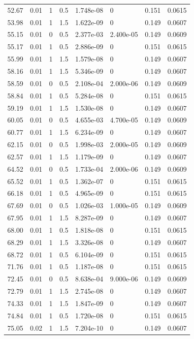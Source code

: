 \documentclass[preview]{standalone}
\begin{document}
{{{\begin{tabular}{L{1.2cm}C{1.2cm} C{0.3cm}C{0.5cm} C{1.4cm}C{1.4cm} C{1.4cm}C{1.4cm}}
  52.67  &  0.01  & 1     & 0.5 &  1.748e-08  & 0  & 0.151 &  0.0615   \\ 
  53.98  &  0.01  & 1     & 1.5 &  1.622e-09  & 0  & 0.149 &  0.0607   \\ 
  55.15  &  0.01  & 0     & 0.5 &  2.377e-03  & 2.400e-05  & 0.149 &  0.0609   \\ 
  55.17  &  0.01  & 1     & 0.5 &  2.886e-09  & 0  & 0.151 &  0.0615   \\ 
  55.99  &  0.01  & 1     & 1.5 &  1.579e-08  & 0  & 0.149 &  0.0607   \\ 
  58.16  &  0.01  & 1     & 1.5 &  5.346e-09  & 0  & 0.149 &  0.0607   \\ 
  58.59  &  0.01  & 0     & 0.5 &  2.108e-04  & 2.000e-06  & 0.149 &  0.0609   \\ 
  58.84  &  0.01  & 1     & 0.5 &  5.284e-08  & 0  & 0.151 &  0.0615   \\ 
  59.19  &  0.01  & 1     & 1.5 &  1.530e-08  & 0  & 0.149 &  0.0607   \\ 
  60.05  &  0.01  & 0     & 0.5 &  4.655e-03  & 4.700e-05  & 0.149 &  0.0609   \\ 
  60.77  &  0.01  & 1     & 1.5 &  6.234e-09  & 0  & 0.149 &  0.0607   \\ 
  62.15  &  0.01  & 0     & 0.5 &  1.998e-03  & 2.000e-05  & 0.149 &  0.0609   \\ 
  62.57  &  0.01  & 1     & 1.5 &  1.179e-09  & 0  & 0.149 &  0.0607   \\ 
  64.52  &  0.01  & 0     & 0.5 &  1.733e-04  & 2.000e-06  & 0.149 &  0.0609   \\ 
  65.52  &  0.01  & 1     & 0.5 &  1.362e-07  & 0  & 0.151 &  0.0615   \\ 
  66.18  &  0.01  & 1     & 0.5 &  4.965e-09  & 0  & 0.151 &  0.0615   \\ 
  67.69  &  0.01  & 0     & 0.5 &  1.026e-03  & 1.000e-05  & 0.149 &  0.0609   \\ 
  67.95  &  0.01  & 1     & 1.5 &  8.287e-09  & 0  & 0.149 &  0.0607   \\ 
  68.00  &  0.01  & 1     & 0.5 &  1.818e-08  & 0  & 0.151 &  0.0615   \\ 
  68.29  &  0.01  & 1     & 1.5 &  3.326e-08  & 0  & 0.149 &  0.0607   \\ 
  68.72  &  0.01  & 1     & 0.5 &  6.104e-09  & 0  & 0.151 &  0.0615   \\ 
  71.76  &  0.01  & 1     & 0.5 &  1.187e-08  & 0  & 0.151 &  0.0615   \\ 
  72.45  &  0.01  & 0     & 0.5 &  8.638e-04  & 9.000e-06  & 0.149 &  0.0609   \\ 
  72.79  &  0.01  & 1     & 1.5 &  2.745e-08  & 0  & 0.149 &  0.0607   \\ 
  74.33  &  0.01  & 1     & 1.5 &  1.847e-09  & 0  & 0.149 &  0.0607   \\ 
  74.84  &  0.01  & 1     & 0.5 &  1.720e-08  & 0  & 0.151 &  0.0615   \\ 
  75.05  &  0.02  & 1     & 1.5 &  7.204e-10  & 0  & 0.149 &  0.0607   \\ 
\hline 
\end{tabular} 

}}}
\end{document}
